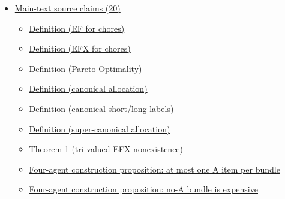 \documentclass[10pt]{article}
\begin{document}
\begin{itemize}[leftmargin=1.2em]
\begin{itemize}[leftmargin=1.2em]
\item \hyperlink{library-prerequisite-b5fb7421a7b0fa8f}{IsCanonicalSmallChoreAllocation}
\item \hyperlink{library-prerequisite-7104bc1ed9b2997f}{EconCSLib.FairDivision.IsLargeChore}
\item \hyperlink{library-prerequisite-4ec5c5b788db5478}{IsOneOrRChoreCost}
\item \hyperlink{library-prerequisite-126791b7110fcec9}{EconCSLib.FairDivision.smallAgentSet}
\item \hyperlink{library-prerequisite-dd10cc5d5fbc610c}{EconCSLib.FairDivision.IsSmallForAtLeastThree}
\item \hyperlink{library-prerequisite-7d30866fb5725e8b}{IsSmallForAtMostOne}
\item \hyperlink{library-prerequisite-ae44c6bc90159d5e}{EconCSLib.FairDivision.IsSmallForExactlyTwo}
\item \hyperlink{library-prerequisite-9936f1893dc14aa4}{IsSuperCanonicalSmallChoreAllocation}
\item \hyperlink{library-prerequisite-62a40b20b9512854}{EconCSLib.FairDivision.IsTriValuedChoreCost}
\end{itemize}
\item \hyperlink{source-section-0c7af8265958a9ea}{Main-text source claims (20)}
\begin{itemize}[leftmargin=1.2em]
\item \hyperlink{source-claim-86903902a11cb58c}{Definition (EF for chores)}
\item \hyperlink{source-claim-dc1c37ece7fbf653}{Definition (EFX for chores)}
\item \hyperlink{source-claim-a1cc8eae6630de31}{Definition (Pareto-Optimality)}
\item \hyperlink{source-claim-28f223907b1b4b26}{Definition (canonical allocation)}
\item \hyperlink{source-claim-1250d6810504d818}{Definition (canonical short/long labels)}
\item \hyperlink{source-claim-b7fd18b85f877d97}{Definition (super-canonical allocation)}
\item \hyperlink{source-claim-707062c38758c055}{Theorem 1 (tri-valued EFX nonexistence)}
\item \hyperlink{source-claim-2321d8010acce683}{Four-agent construction proposition: at most one A item per bundle}
\item \hyperlink{source-claim-120f295a37ffc0ce}{Four-agent construction proposition: no-A bundle is expensive}

\end{itemize}
\end{itemize}
\end{document}
